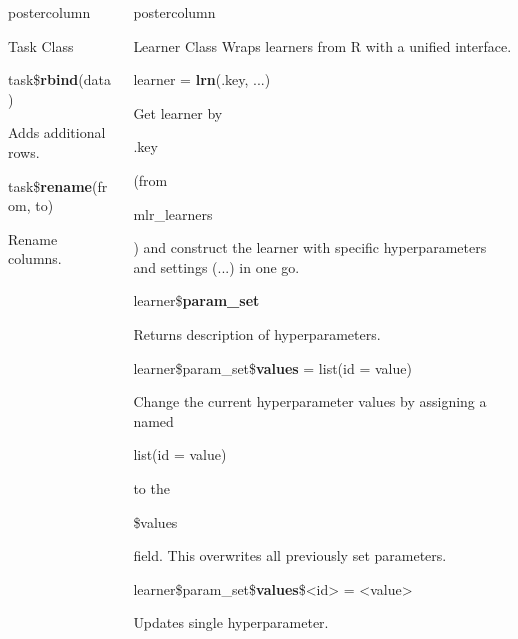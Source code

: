 \documentclass{beamer}
\newlength{\columnheight} %
\newcommand{\codeinline}[1]{\begin{codeboxinline}#1\end{codeboxinline}}
\begin{document}
\begin{frame}[fragile]{}
\begin{columns}
\begin{column}{.245\textwidth}
\begin{beamercolorbox}[center]{postercolumn}
\begin{minipage}{.98\textwidth}
{\begin{myblock}{Task Class}
							\\
							\begin{codebox}
								task\$\textbf{rbind}(data)
							\end{codebox}
							Adds additional rows.
							\\
							\begin{codebox}
								task\$\textbf{rename}(from, to)
							\end{codebox}
							Rename columns.
						\end{myblock}
					\vfill}
				\end{minipage}
			\end{beamercolorbox}
		\end{column}
		\begin{column}{.245\textwidth}
			\begin{beamercolorbox}[center]{postercolumn}
				\begin{minipage}{.98\textwidth}
					\parbox[t][\columnheight]{\textwidth}{
						\begin{myblock}{Learner Class}
							Wraps learners from R with a unified interface.
							\\
							\begin{codebox}
								learner = \textbf{lrn}(.key, ...)
							\end{codebox}
							Get learner by \codeinline{.key} (from \codeinline{mlr\_learners}) 
							and construct the learner with specific hyperparameters and settings (...) in one go.
							\\
							\begin{codebox}
								learner\$\textbf{param\_set}
							\end{codebox}
							Returns description of hyperparameters.	
							\\
							\begin{codebox}
								learner\$param\_set\$\textbf{values} = list(id = value)
							\end{codebox}
							Change the current hyperparameter values by assigning a named \codeinline{list(id = value)} to the \codeinline{\$values} field.
							This overwrites all previously set parameters.	
							\\
							\begin{codebox}
								learner\$param\_set\$\textbf{values}\$<id> = <value>
							\end{codebox}
							Updates single hyperparameter.
							\vspace{1em}
							\\
							\begin{codebox}

\end{codebox}
\end{myblock}}
\end{minipage}
\end{beamercolorbox}
\end{column}
\end{columns}
\end{frame}
\end{document}
